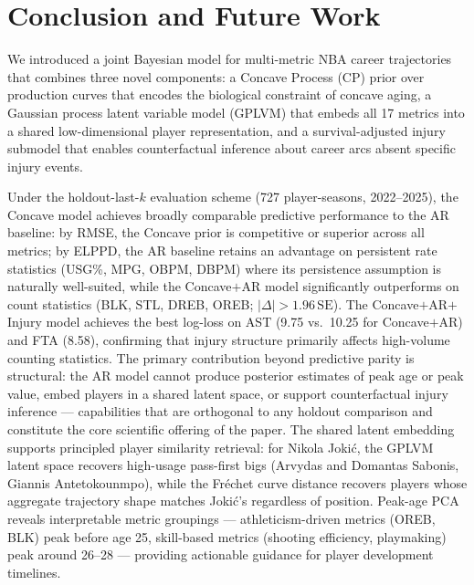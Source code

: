 \documentclass[aoas]{imsart}
\begin{document}
\clearpage
\section{Conclusion and Future Work}
\label{sec:conclusion}

We introduced a joint Bayesian model for multi-metric NBA career trajectories that combines three novel components: a Concave Process (CP) prior over production curves that encodes the biological constraint of concave aging, a Gaussian process latent variable model (GPLVM) that embeds all 17 metrics into a shared low-dimensional player representation, and a survival-adjusted injury submodel that enables counterfactual inference about career arcs absent specific injury events.

Under the holdout-last-$k$ evaluation scheme (727 player-seasons, 2022--2025), the Concave model achieves broadly comparable predictive performance to the AR baseline: by RMSE, the Concave prior is competitive or superior across all metrics; by ELPPD, the AR baseline retains an advantage on persistent rate statistics (USG\%, MPG, OBPM, DBPM) where its persistence assumption is naturally well-suited, while the Concave$+$AR model significantly outperforms on count statistics (BLK, STL, DREB, OREB; $|\Delta|>1.96\,\mathrm{SE}$).
The Concave$+$AR$+$Injury model achieves the best log-loss on AST (9.75 vs.\ 10.25 for Concave$+$AR) and FTA (8.58), confirming that injury structure primarily affects high-volume counting statistics.
The primary contribution beyond predictive parity is structural: the AR model cannot produce posterior estimates of peak age or peak value, embed players in a shared latent space, or support counterfactual injury inference --- capabilities that are orthogonal to any holdout comparison and constitute the core scientific offering of the paper.
The shared latent embedding supports principled player similarity retrieval: for Nikola Joki\'{c}, the GPLVM latent space recovers high-usage pass-first bigs (Arvydas and Domantas Sabonis, Giannis Antetokounmpo), while the Fr\'{e}chet curve distance recovers players whose aggregate trajectory shape matches Joki\'{c}'s regardless of position.
Peak-age PCA reveals interpretable metric groupings --- athleticism-driven metrics (OREB, BLK) peak before age 25, skill-based metrics (shooting efficiency, playmaking) peak around 26--28 --- providing actionable guidance for player development timelines.
\end{document}
